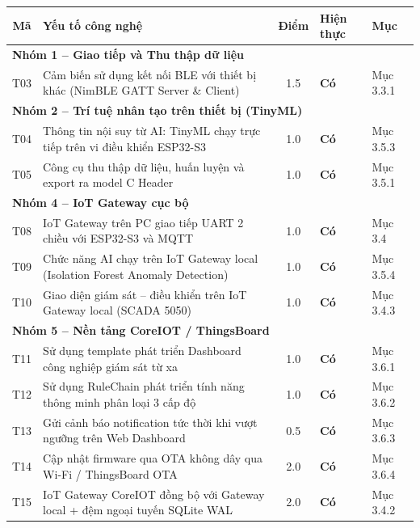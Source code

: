 \begin{table}[H]
\centering
\small
\setlength{\tabcolsep}{5pt}
\renewcommand{\arraystretch}{1.25}
\begin{tabularx}{\textwidth}{|c|>{\raggedright\arraybackslash}X|c|>{\centering\arraybackslash}p{1.8cm}|>{\centering\arraybackslash}p{1.8cm}|}
\hline
\textbf{Mã} & \textbf{Yếu tố công nghệ} & \textbf{Điểm} & \textbf{Hiện thực} & \textbf{Mục} \\ \hline
\multicolumn{5}{|l|}{\textbf{Nhóm 1 -- Giao tiếp và Thu thập dữ liệu}} \\ \hline
T03 & Cảm biến sử dụng kết nối BLE với thiết bị khác (NimBLE GATT Server \& Client) & 1.5 & \textbf{Có} & Mục 3.3.1 \\ \hline
\multicolumn{5}{|l|}{\textbf{Nhóm 2 -- Trí tuệ nhân tạo trên thiết bị (TinyML)}} \\ \hline
T04 & Thông tin nội suy từ AI: TinyML chạy trực tiếp trên vi điều khiển ESP32-S3 & 1.0 & \textbf{Có} & Mục 3.5.3 \\ \hline
T05 & Công cụ thu thập dữ liệu, huấn luyện và export ra model C Header & 1.0 & \textbf{Có} & Mục 3.5.1 \\ \hline
\multicolumn{5}{|l|}{\textbf{Nhóm 4 -- IoT Gateway cục bộ}} \\ \hline
T08 & IoT Gateway trên PC giao tiếp UART 2 chiều với ESP32-S3 và MQTT & 1.0 & \textbf{Có} & Mục 3.4 \\ \hline
T09 & Chức năng AI chạy trên IoT Gateway local (Isolation Forest Anomaly Detection) & 1.0 & \textbf{Có} & Mục 3.5.4 \\ \hline
T10 & Giao diện giám sát -- điều khiển trên IoT Gateway local (SCADA 5050) & 1.0 & \textbf{Có} & Mục 3.4.3 \\ \hline
\multicolumn{5}{|l|}{\textbf{Nhóm 5 -- Nền tảng CoreIOT / ThingsBoard}} \\ \hline
T11 & Sử dụng template phát triển Dashboard công nghiệp giám sát từ xa & 1.0 & \textbf{Có} & Mục 3.6.1 \\ \hline
T12 & Sử dụng RuleChain phát triển tính năng thông minh phân loại 3 cấp độ & 1.0 & \textbf{Có} & Mục 3.6.2 \\ \hline
T13 & Gửi cảnh báo notification tức thời khi vượt ngưỡng trên Web Dashboard & 0.5 & \textbf{Có} & Mục 3.6.3 \\ \hline
T14 & Cập nhật firmware qua OTA không dây qua Wi-Fi / ThingsBoard OTA & 2.0 & \textbf{Có} & Mục 3.6.4 \\ \hline
T15 & IoT Gateway CoreIOT đồng bộ với Gateway local + đệm ngoại tuyến SQLite WAL & 2.0 & \textbf{Có} & Mục 3.4.2 \\ \hline
\end{tabularx}
\end{table}

